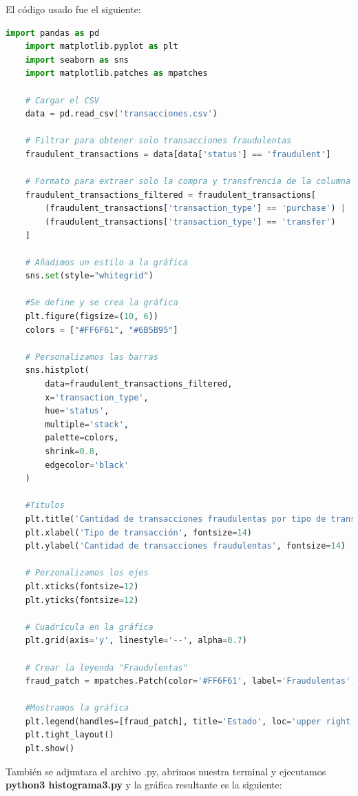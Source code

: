 \documentclass{article}
\begin{document}
\begin{itemize}
    El código usado fue el siguiente:

    \begin{lstlisting}[language=Python, caption=Implementación DES(Data Encryption Standard)]
    import pandas as pd
    import matplotlib.pyplot as plt
    import seaborn as sns
    import matplotlib.patches as mpatches

    # Cargar el CSV
    data = pd.read_csv('transacciones.csv')

    # Filtrar para obtener solo transacciones fraudulentas
    fraudulent_transactions = data[data['status'] == 'fraudulent']

    # Formato para extraer solo la compra y transfrencia de la columna 'purchase' y 'transfer'
    fraudulent_transactions_filtered = fraudulent_transactions[
        (fraudulent_transactions['transaction_type'] == 'purchase') | 
        (fraudulent_transactions['transaction_type'] == 'transfer')
    ]

    # Añadimos un estilo a la gráfica
    sns.set(style="whitegrid")

    #Se define y se crea la gráfica
    plt.figure(figsize=(10, 6)) 
    colors = ["#FF6F61", "#6B5B95"]

    # Personalizamos las barras
    sns.histplot(
        data=fraudulent_transactions_filtered, 
        x='transaction_type', 
        hue='status', 
        multiple='stack', 
        palette=colors,
        shrink=0.8,  
        edgecolor='black'  
    )

    #Titulos
    plt.title('Cantidad de transacciones fraudulentas por tipo de transacción', fontsize=16, fontweight='bold')
    plt.xlabel('Tipo de transacción', fontsize=14)
    plt.ylabel('Cantidad de transacciones fraudulentas', fontsize=14)

    # Perzonalizamos los ejes
    plt.xticks(fontsize=12)
    plt.yticks(fontsize=12)

    # Cuadrícula en la gráfica 
    plt.grid(axis='y', linestyle='--', alpha=0.7)

    # Crear la leyenda "Fraudulentas"
    fraud_patch = mpatches.Patch(color='#FF6F61', label='Fraudulentas')

    #Mostramos la gráfica
    plt.legend(handles=[fraud_patch], title='Estado', loc='upper right', fontsize=12)
    plt.tight_layout()
    plt.show()
    \end{lstlisting}

    También se adjuntara el archivo .py, abrimos nuestra terminal y ejecutamos \textbf{python3 histograma3.py} y la gráfica resultante es la siguiente:


\end{itemize}
\end{document}
